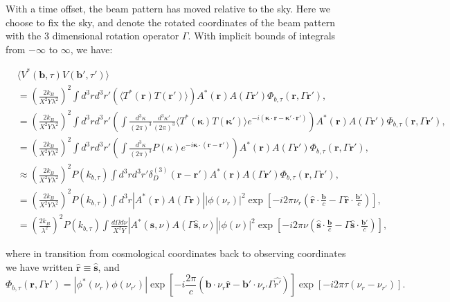 \documentclass[twocolumn,apj,numberedappendix]{emulateapj}
\renewcommand\[{\begin{equation}}
\renewcommand\]{\end{equation}}
\begin{document}
With a time offset, the beam pattern has moved relative to the sky.
Here we choose to fix the sky, and denote the rotated coordinates
of the beam pattern with the 3 dimensional rotation operator $\Gamma$. With implicit bounds
of integrals from $-\infty$ to $\infty$, we have:
\begin{widetext}
\begin{equation}
\begin{aligned} & \langle V^{*}(\boldsymbol{b},\tau)V(\boldsymbol{b'},\tau')\rangle\\
 & =\left(\frac{2k_{B}}{X^{2}Y\lambda^{2}}\right)^{2}\int d^{3}rd^{3}r'\left(\langle T^{*}(\boldsymbol{r})T(\boldsymbol{r'})\rangle\right)A^{*}(\boldsymbol{r})A(\Gamma \boldsymbol{r'})\Phi_{b,\tau}(\boldsymbol{r},\Gamma \boldsymbol{r'}),\\
 & =\left(\frac{2k_{B}}{X^{2}Y\lambda^{2}}\right)^{2}\int d^{3}rd^{3}r'\left(\int\frac{d^{3}\kappa}{(2\pi)^{3}}\frac{d^{3}\kappa'}{(2\pi)^{3}}\langle T^{*}(\boldsymbol{\kappa})T(\boldsymbol{\kappa'})\rangle e^{-i(\boldsymbol{\kappa}\cdot \boldsymbol{r}-\boldsymbol{\kappa'}\cdot\boldsymbol{r'})}\right)A^{*}(\boldsymbol{r})A(\Gamma \boldsymbol{r'})\Phi_{b,\tau}(\boldsymbol{r},\Gamma \boldsymbol{r'}),\\
 & =\left(\frac{2k_{B}}{X^{2}Y\lambda^{2}}\right)^{2}\int d^{3}rd^{3}r'\left(\int\frac{d^{3}\kappa}{(2\pi)^{3}}P(\kappa)e^{-i\boldsymbol{\kappa}\cdot(\boldsymbol{r}-\boldsymbol{r'})}\right)A^{*}(\boldsymbol{r})A(\Gamma \boldsymbol{r'})\Phi_{b,\tau}(\boldsymbol{r},\Gamma \boldsymbol{r'}),\\
 & \approx\left(\frac{2k_{B}}{X^{2}Y\lambda^{2}}\right)^{2}P(k_{b,\tau})\int d^{3}rd^{3}r'\delta_{D}^{(3)}(\boldsymbol{r}-\boldsymbol{r'})A^{*}(\boldsymbol{r})A(\Gamma \boldsymbol{r'})\Phi_{b,\tau}(\boldsymbol{r},\Gamma \boldsymbol{r'}),\\
 & =\left(\frac{2k_{B}}{X^{2}Y\lambda^{2}}\right)^{2}P(k_{b,\tau})\int d^{3}r|A^{*}(\boldsymbol{r})A(\Gamma \boldsymbol{r})||\phi(\nu_{r})|^{2}\exp\left[-i2\pi\nu_{r}\left(\hat{\boldsymbol{r}}\cdot\frac{\boldsymbol{b}}{c}-\Gamma \hat{\boldsymbol{r}}\cdot\frac{\boldsymbol{b'}}{c}\right)\right],\\
 & =\left(\frac{2k_{B}}{\lambda^{2}}\right)^{2}P(k_{b,\tau})\int\frac{d\Omega d\nu}{X^{2}Y}|A^{*}(\hat{\boldsymbol{s}},\nu)A(\Gamma \hat{\boldsymbol{s}},\nu)||\phi(\nu)|^{2}\exp\left[-i2\pi\nu\left(\hat{\boldsymbol{s}}\cdot\frac{\boldsymbol{b}}{c}-\Gamma\hat{\boldsymbol{s}}\cdot\frac{\boldsymbol{b'}}{c}\right)\right],
\end{aligned}
\label{eq:main}
\end{equation}

where in transition from cosmological coordinates back to observing coordinates we have written $\hat{\boldsymbol{r}}\equiv\hat{\boldsymbol{s}}$, and 
\begin{equation}
\Phi_{b,\tau}(\boldsymbol{r},\Gamma \boldsymbol{r'})=|{\phi^{*}}(\ensuremath{\nu_{r}})\phi(\nu_{r'})|\exp\left[-i\frac{2\pi}{c}\left(\boldsymbol{b}\cdot\nu_{r}\hat{\boldsymbol{r}}-\boldsymbol{b'}\cdot\nu_{r'}\Gamma\hat{r'}\right)\right]\exp\left[-i2\pi\tau\left(\nu_{r}-\nu_{r'}\right)\right].
\end{equation}
\end{widetext}
\end{document}
